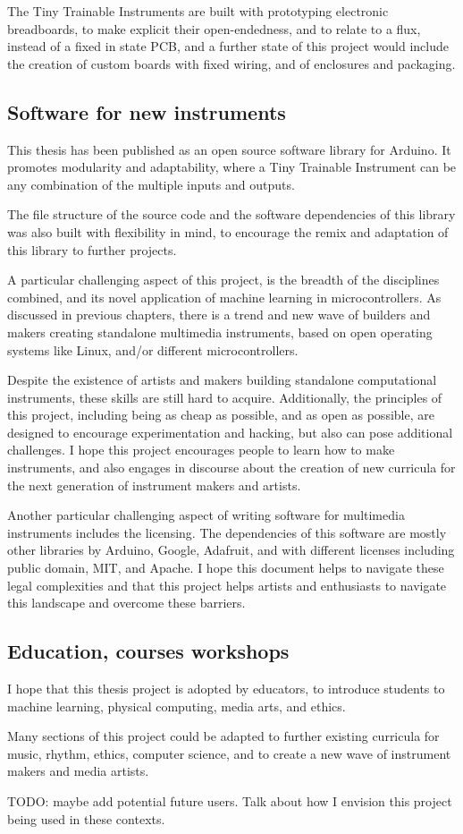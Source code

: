 The Tiny Trainable Instruments are built with prototyping electronic breadboards, to make explicit their open-endedness, and to relate to a flux, instead of a fixed in state PCB, and a further state of this project would include the creation of custom boards with fixed wiring, and of enclosures and packaging.


\subsection{Software for new instruments}

This thesis has been published as an open source software library for Arduino. It promotes modularity and adaptability, where a Tiny Trainable Instrument can be any combination of the multiple inputs and outputs.

The file structure of the source code and the software dependencies of this library was also built with flexibility in mind, to encourage the remix and adaptation of this library to further projects.

A particular challenging aspect of this project, is the breadth of the disciplines combined, and its novel application of machine learning in microcontrollers. As discussed in previous chapters, there is a trend and new wave of builders and makers creating standalone multimedia instruments, based on open operating systems like Linux, and/or different microcontrollers. 

Despite the existence of artists and makers building standalone computational instruments, these skills are still hard to acquire. Additionally, the principles of this project, including being as cheap as possible, and as open as possible, are designed to encourage experimentation and hacking, but also can pose additional challenges. I hope this project encourages people to learn how to make instruments, and also engages in discourse about the creation of new curricula for the next generation of instrument makers and artists.

Another particular challenging aspect of writing software for multimedia instruments includes the licensing. The dependencies of this software are mostly other libraries by Arduino, Google, Adafruit, and with different licenses including public domain, MIT, and Apache. I hope this document helps to navigate these legal complexities and that this project helps artists and enthusiasts to navigate this landscape and overcome these barriers.

\subsection{Education, courses workshops}

I hope that this thesis project is adopted by educators, to introduce students to machine learning, physical computing, media arts, and ethics.

Many sections of this project could be adapted to further existing curricula for music, rhythm, ethics, computer science, and to create a new wave of instrument makers and media artists.

TODO: maybe add potential future users. Talk about how I envision this project being used in these contexts.
